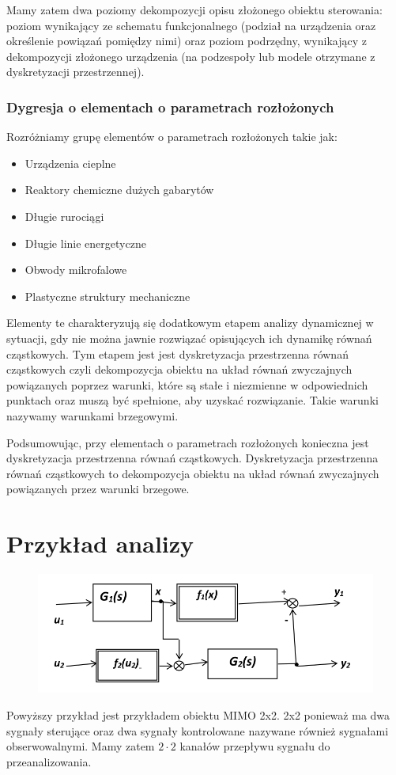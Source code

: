 \documentclass{article}
\begin{document}
		Mamy zatem dwa poziomy dekompozycji opisu złożonego obiektu sterowania: poziom
		wynikający ze schematu funkcjonalnego (podział na urządzenia oraz określenie powiązań
		pomiędzy nimi) oraz poziom podrzędny, wynikający z dekompozycji złożonego urządzenia (na
		podzespoły lub modele otrzymane z dyskretyzacji przestrzennej).
		\subsubsection{Dygresja o elementach o parametrach rozłożonych}
			Rozróżniamy grupę elementów o parametrach rozłożonych takie jak:
			\begin{itemize}
				\item Urządzenia cieplne 
				\item Reaktory chemiczne dużych gabarytów
				\item Długie rurociągi
				\item Długie linie energetyczne
				\item Obwody mikrofalowe
				\item Plastyczne struktury mechaniczne
			\end{itemize}

			Elementy te charakteryzują się dodatkowym etapem analizy dynamicznej
			w sytuacji, gdy nie można jawnie rozwiązać opisujących ich dynamikę równań cząstkowych.
			Tym etapem jest jest dyskretyzacja przestrzenna równań cząstkowych czyli dekompozycja obiektu na układ równań
			zwyczajnych powiązanych poprzez warunki, które są stałe i niezmienne w odpowiednich punktach
			oraz muszą być spełnione, aby uzyskać rozwiązanie. Takie warunki nazywamy warunkami brzegowymi.

			Podsumowując, przy elementach o parametrach rozłożonych konieczna jest dyskretyzacja przestrzenna równań
			cząstkowych. Dyskretyzacja przestrzenna równań cząstkowych to dekompozycja obiektu na układ równań zwyczajnych
			powiązanych przez warunki brzegowe.
	\section{Przykład analizy}
		\begin{figure}
			\includegraphics[height=0.3\textwidth]{PrzykladDoAnalizy.png}
		\end{figure}
		Powyższy przykład jest przykładem obiektu MIMO 2x2. 2x2 ponieważ ma dwa sygnały sterujące oraz dwa 
		sygnały kontrolowane nazywane również sygnałami obserwowalnymi. Mamy zatem $ 2 \cdot 2 $ kanałów przepływu
		sygnału do przeanalizowania. 
\end{document}
